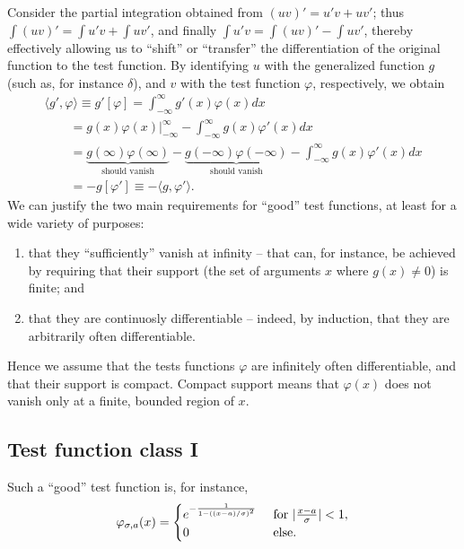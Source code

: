 Consider the partial integration
obtained from $(uv)' = u'v+uv'$; thus
$\int (uv)' = \int u'v+\int uv'$,
and finally   $\int u'v = \int (uv)'  -\int uv'$,
thereby effectively allowing us to ``shift'' or ``transfer''
the differentiation of the original function to the test function.
By identifying $u$ with the generalized function $g$ (such as, for instance  $\delta$),
and $v$ with the test function $\varphi$, respectively, we obtain
\begin{equation}
\begin{split}
\langle g' ,    \varphi  \rangle
\equiv
g'[\varphi] =
\int_{-\infty}^\infty
g'(x)\varphi(x)
dx      \\
\qquad
=
\left.
g(x)\varphi(x)\right|_{-\infty}^\infty
-  \int_{-\infty}^\infty
g(x)\varphi'(x)
dx           \\
\qquad
=
\underbrace{g(\infty)\varphi(\infty)}_{\textrm{should vanish}} - \underbrace{g(-\infty)\varphi(-\infty)}_{\textrm{should vanish}}
-  \int_{-\infty}^\infty
g(x)\varphi'(x)
dx  \\
\qquad
= - g[\varphi'] \equiv   -   \langle g ,    \varphi'  \rangle
.
\end{split}
\label{2012-m-ch-di-desiderata}
\end{equation}
We can justify the two main requirements for ``good'' test functions, at least for a wide variety of purposes:
\begin{enumerate}
\item
that they ``sufficiently'' vanish at infinity -- that can, for instance, be achieved by requiring that their support
(the set of arguments $x$ where $g(x)\neq 0$) is finite; and
\item
that they are continuosly differentiable -- indeed, by induction, that they are arbitrarily often differentiable.
\end{enumerate}
Hence
we assume \cite{schwartz} that the tests functions $\varphi$
are infinitely often differentiable, and that their support is compact.
Compact support means that $\varphi (x)$ does not vanish only at a finite, bounded region of $x$.

\subsection{Test function class I}

Such a ``good'' test function is, for instance,
\begin{equation}
\varphi_{\sigma ,a}(x)
=
\begin{cases}
e^{-{1\over 1-((x-a)/\sigma )^2}} & \textrm{ for } \vert  {x-a\over \sigma }\vert <1, \\
                                0 & \textrm{ else.}
\end{cases}
\end{equation}

